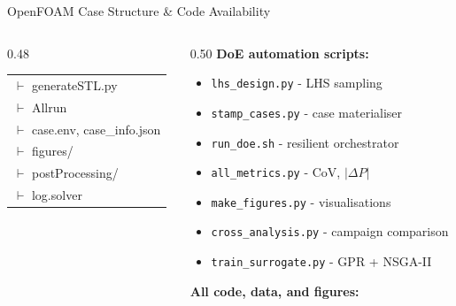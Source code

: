 \documentclass[10pt, aspectratio=169]{beamer}
\begin{document}
\begin{frame}[fragile]{OpenFOAM Case Structure \& Code Availability}
\begin{columns}[T]
\begin{column}{0.48\textwidth}
\begin{tabular}{@{}l@{}}
                \hspace{0.6em}$\vdash$\hspace{0.3em} generateSTL.py \\
                \hspace{0.6em}$\vdash$\hspace{0.3em} Allrun\hspace{1.5em}{\rmfamily\itshape Full pipeline script} \\
                \hspace{0.6em}$\vdash$\hspace{0.3em} case.env, case\_info.json \\
                \hspace{0.6em}$\vdash$\hspace{0.3em} figures/\hspace{1em}{\rmfamily\itshape 13 PNG per case} \\
                \hspace{0.6em}$\vdash$\hspace{0.3em} postProcessing/ \\
                \hspace{0.6em}$\vdash$\hspace{0.3em} log.solver \\
            \end{tabular}
            \rmfamily
        \end{column}
        \begin{column}{0.50\textwidth}
            \textbf{DoE automation scripts:}
            \begin{itemize}\small\setlength{\itemsep}{2pt}
                \item \texttt{lhs\_design.py} - LHS sampling
                \item \texttt{stamp\_cases.py} - case materialiser
                \item \texttt{run\_doe.sh} - resilient orchestrator
                \item \texttt{all\_metrics.py} - CoV, $|\Delta P|$
                \item \texttt{make\_figures.py} - visualisations
                \item \texttt{cross\_analysis.py} - campaign comparison
                \item \texttt{train\_surrogate.py} - GPR + NSGA-II
            \end{itemize}

            \vspace{0.5em}
            \textbf{All code, data, and figures:}


\end{column}
\end{columns}
\end{frame}
\end{document}
